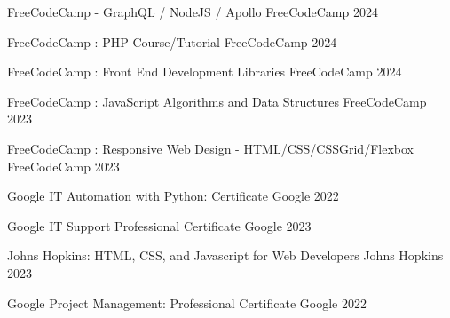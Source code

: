 

\begin{cvhonors}

  \cvhonor
    {FreeCodeCamp - GraphQL / NodeJS / Apollo} %
    {FreeCodeCamp} %
    {} %
    {2024} %

  \cvhonor
    {FreeCodeCamp : PHP Course/Tutorial} %
    {FreeCodeCamp} %
    {} %
    {2024} %

  \cvhonor
    {FreeCodeCamp : Front End Development Libraries} %
    {FreeCodeCamp} %
    {} %
    {2024} %

  \cvhonor
    {FreeCodeCamp : JavaScript Algorithms and Data Structures} %
    {FreeCodeCamp} %
    {} %
    {2023} %

  \cvhonor
    {FreeCodeCamp : Responsive Web Design - HTML/CSS/CSSGrid/Flexbox} %
    {FreeCodeCamp} %
    {} %
    {2023} %

  \cvhonor
    {Google IT Automation with Python: Certificate} %
    {Google} %
    {} %
    {2022} %

  \cvhonor
    {Google IT Support Professional Certificate} %
    {Google} %
    {} %
    {2023} %

  \cvhonor
    {Johns Hopkins: HTML, CSS, and Javascript for Web Developers} %
    {Johns Hopkins} %
    {} %
    {2023} %

  \cvhonor
    {Google Project Management: Professional Certificate} %
    {Google} %
    {} %
    {2022} %


\end{cvhonors}
